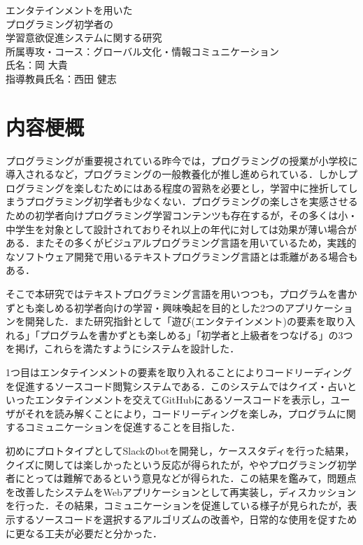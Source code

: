 \begin{center}
  {\Large エンタテインメントを用いた\\プログラミング初学者の\\学習意欲促進システムに関する研究}\\
  \vspace{20truept}
    \large{所属専攻・コース：グローバル文化・情報コミュニケーション\\}
    \large{氏名：岡 大貴\\}
    \large{指導教員氏名：西田 健志\\}
\end{center}

\section*{内容梗概}

プログラミングが重要視されている昨今では，プログラミングの授業が小学校に導入されるなど，プログラミングの一般教養化が推し進められている．しかしプログラミングを楽しむためにはある程度の習熟を必要とし，学習中に挫折してしまうプログラミング初学者も少なくない．プログラミングの楽しさを実感させるための初学者向けプログラミング学習コンテンツも存在するが，その多くは小・中学生を対象として設計されておりそれ以上の年代に対しては効果が薄い場合がある．またその多くがビジュアルプログラミング言語を用いているため，実践的なソフトウェア開発で用いるテキストプログラミング言語とは乖離がある場合もある．

そこで本研究ではテキストプログラミング言語を用いつつも，プログラムを書かずとも楽しめる初学者向けの学習・興味喚起を目的とした2つのアプリケーションを開発した．また研究指針として「遊び(エンタテインメント)の要素を取り入れる」「プログラムを書かずとも楽しめる」「初学者と上級者をつなげる」の3つを掲げ，これらを満たすようにシステムを設計した．

1つ目はエンタテインメントの要素を取り入れることによりコードリーディングを促進するソースコード閲覧システムである．このシステムではクイズ・占いといったエンタテインメントを交えてGitHubにあるソースコードを表示し，ユーザがそれを読み解くことにより，コードリーディングを楽しみ，プログラムに関するコミュニケーションを促進することを目指した．

初めにプロトタイプとしてSlackのbotを開発し，ケーススタディを行った結果，クイズに関しては楽しかったという反応が得られたが，ややプログラミング初学者にとっては難解であるという意見などが得られた．この結果を鑑みて，問題点を改善したシステムをWebアプリケーションとして再実装し，ディスカッションを行った．その結果，コミュニケーションを促進している様子が見られたが，表示するソースコードを選択するアルゴリズムの改善や，日常的な使用を促すために更なる工夫が必要だと分かった．

